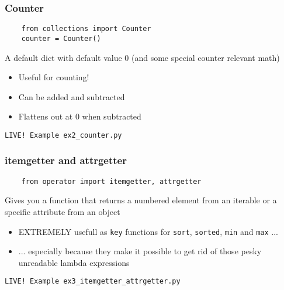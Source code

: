 \documentclass{beamer}
\begin{document}
\begin{frame}[fragile]
  \frametitle{Counter}
  \begin{verbatim}
    from collections import Counter
    counter = Counter()
  \end{verbatim}
  \begin{block}{\vspace*{-3ex}}
    A default dict with default value 0 (and some special counter
    relevant math)
  \end{block}
  \begin{itemize}
  \item Useful for counting!
  \item Can be added and subtracted
  \item Flattens out at 0 when subtracted
  \end{itemize}
  \begin{center}
    \texttt{LIVE! Example ex2\_counter.py}
  \end{center}
\end{frame}

\begin{frame}[fragile]
  \frametitle{itemgetter and attrgetter}
  \begin{verbatim}
    from operator import itemgetter, attrgetter
  \end{verbatim}
  \begin{block}{\vspace*{-3ex}}
    Gives you a function that returns a numbered element from an
    iterable or a specific attribute from an object
  \end{block}
  \begin{itemize}
  \item {\color{darkred}EXTREMELY} usefull as \texttt{key} functions for
    \texttt{sort}, \texttt{sorted}, \texttt{min} and \texttt{max} ...
  \item ... especially because they make it possible to get rid of
    those pesky unreadable lambda expressions
  \end{itemize}
  \begin{center}
    \texttt{LIVE! Example ex3\_itemgetter\_attrgetter.py}
  \end{center}
\end{frame}
\end{document}
